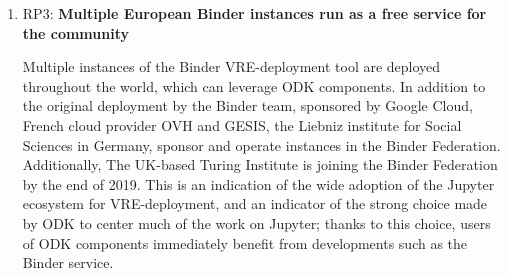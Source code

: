 \begin{enumerate}
\item RP3: \textbf{Multiple European Binder instances run as a free service for the community}

\label{}
  
Multiple instances of the Binder VRE-deployment tool
are deployed throughout the world,
which can leverage ODK components.
In addition to the original deployment by the Binder team,
sponsored by Google Cloud,
French cloud provider OVH
and GESIS,
the Liebniz institute for Social Sciences in Germany,
sponsor and operate instances in the Binder Federation.
Additionally,
The UK-based Turing Institute is joining the Binder Federation by the end of 2019.
This is an indication of the wide adoption of the Jupyter ecosystem for VRE-deployment,
and an indicator of the strong choice made by ODK
to center much of the work on Jupyter; thanks to this choice,
users of ODK components immediately benefit
from developments such as the Binder service.







\end{enumerate}
